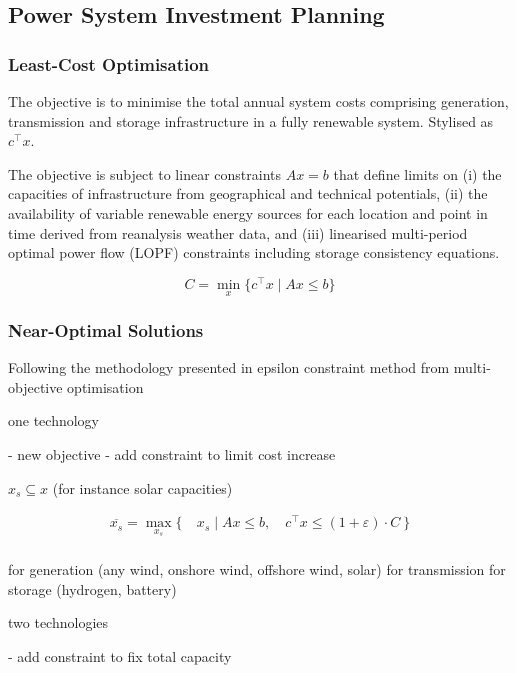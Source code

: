 \subsection{Power System Investment Planning}
\label{sec:model}

\subsubsection{Least-Cost Optimisation}

The objective is to minimise the total annual system costs comprising generation, transmission and storage infrastructure in a fully renewable system. Stylised as $c^\top x$.

The objective is subject to linear constraints $Ax=b$ that define limits on
(i) the capacities of infrastructure from geographical and technical potentials,
(ii) the availability of variable renewable energy sources for each location and point in time derived from reanalysis weather data, and
(iii) linearised multi-period optimal power flow (LOPF) constraints including storage consistency equations.

\begin{equation}
    C = \min_x\{c^\top x \mid Ax\leq b\}
\end{equation}

\subsubsection{Near-Optimal Solutions}

Following the methodology presented in \cite{nearoptimal}
epsilon constraint method from multi-objective optimisation \cite{mavrotas_effective_2009}

one technology

- new objective
- add constraint to limit cost increase

$x_s\subseteq x$ (for instance solar capacities)

\begin{align}
    \overline{x_s} = \max_{x_s}\{\:&x_s \mid Ax\leq b,\quad c^\top x\leq (1+\varepsilon)\cdot C \:\} \\
\end{align}

for generation (any wind, onshore wind, offshore wind, solar)
for transmission
for storage (hydrogen, battery)

two technologies

- add constraint to fix total capacity

